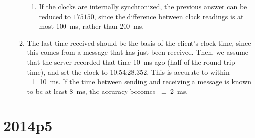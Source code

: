 \documentclass{article}
\begin{document}
\begin{enumerate}
\begin{enumerate}
\begin{enumerate}
          \item If the clocks are internally synchronized, the previous answer can be reduced to $175 150$, since the difference between clock readings is at most \SI{100}{ms}, rather than \SI{200}{ms}.
        \end{enumerate}
      \item The last time received should be the basis of the client's clock time, since this comes from a message that has just been received. Then, we assume that the server recorded that time \SI{10}{ms} ago (half of the round-trip time), and set the clock to 10:54:28.352. This is accurate to within \SI{\pm 10}{ms}. If the time between sending and receiving a message is known to be at least \SI{8}{ms}, the accuracy becomes \SI{\pm 2}{ms}.
    \end{enumerate}
\end{enumerate}

\section{2014p5}
\end{document}
